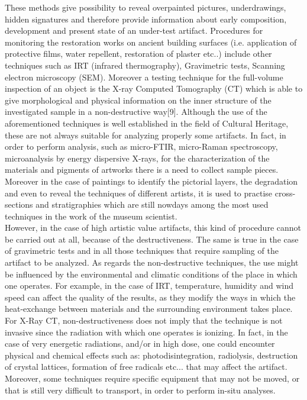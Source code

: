 \documentclass[a4paper,11pt]{report}
\begin{document}
These methods give possibility to reveal overpainted pictures, underdrawings, hidden signatures and therefore provide information about early composition, development and present state of an under-test artifact. Procedures for monitoring the restoration works on ancient building surfaces (i.e. application of protective films, water repellent, restoration of plaster etc..) include other techniques such as IRT (infrared thermography), Gravimetric tests, Scanning electron microscopy (SEM). Moreover a testing technique for the full-volume inspection of an object is the X-ray Computed Tomography (CT) which is able to give morphological and physical information on the inner structure of the investigated sample in a non-destructive way[9]. Although the use of the aforementioned techniques is well established in the field of Cultural Heritage, these are not always suitable for analyzing properly some artifacts. In fact, in order to perform analysis, such as micro-FTIR, micro-Raman spectroscopy, microanalysis by energy dispersive X-rays, for the characterization of the materials and pigments of artworks there is a need to collect sample pieces. Moreover in the case of paintings to identify the pictorial layers, the degradation and even to reveal the techniques of different artists, it is used to practise cross-sections and stratigraphies which are still nowdays among the most used techniques in the work of the museum scientist\cite{sette}.\\
However, in the case of high artistic value artifacts, this kind of procedure cannot be carried out at all, because of the destructiveness. The same is true in the case of gravimetric tests and in all those techniques that require sampling of the artifact to be analyzed. As regards the non-destructive techniques, the use might be influenced by the environmental and climatic conditions of the place in which one operates. For example, in the case of IRT, temperature, humidity and wind speed can affect the quality of the results, as they modify the ways in which the heat-exchange between materials and the surrounding environment takes place. For X-Ray CT, non-destructiveness does not imply that the technique is not invasive since the radiation with which one operates is ionizing. In fact, in the case of very energetic radiations, and/or in high dose, one could encounter physical and chemical effects such as: photodisintegration, radiolysis, destruction of crystal lattices, formation of free radicals etc... that may affect the artifact. Moreover, some techniques require specific equipment that may not be moved, or that is still very difficult to transport, in order to perform in-situ analyses.\\
\end{document}
